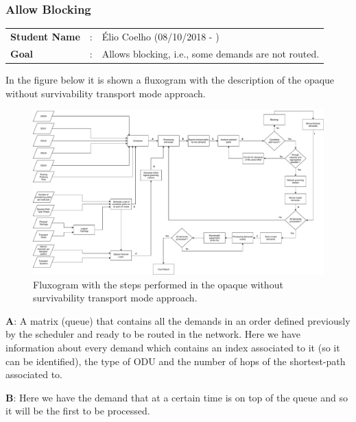 \subsubsection{Allow Blocking}

\begin{tcolorbox}	
	\begin{tabular}{p{2.75cm} p{0.2cm} p{10.5cm}} 	
		\textbf{Student Name}   &:& \'Elio Coelho    (08/10/2018 - )\\
		\textbf{Goal}           &:& Allows blocking, i.e., some demands are not routed.
	\end{tabular}
\end{tcolorbox}

\vspace{13pt}

In the figure below it is shown a fluxogram with the description of the opaque without survivability transport mode approach.

\begin{figure}[H]
	\centering
	\includegraphics[width=16cm]{sdf/heuristic/opaque_survivability/figures/fluxograma}
	\caption{Fluxogram with the steps performed in the opaque without survivability transport mode approach.}
	\label{fluxogram_opaque_surv}
\end{figure}

\textbf{A}: A matrix (queue) that contains all the demands in an order defined previously by the scheduler and ready to be routed in the network. Here we have information about every demand which contains an index associated to it (so it can be identified), the type of ODU and the number of hops of the shortest-path associated to.

\textbf{B}: Here we have the demand that at a certain time is on top of the queue and so it will be the first to be processed.


